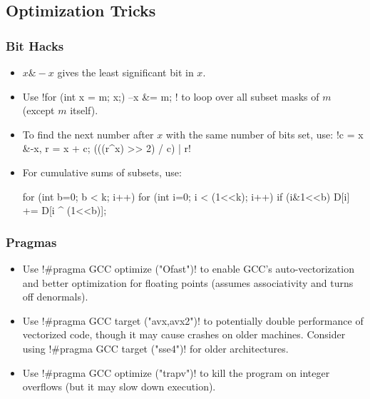 \subsection{Optimization Tricks}

\subsubsection{Bit Hacks}
\begin{itemize}
    \item \( x \& -x \) gives the least significant bit in \( x \).
    \item Use \inlinecode!for (int x = m; x;) { --x &= m; }! to loop over all subset
          masks of \( m \) (except \( m \) itself).
    \item To find the next number after \( x \) with the same number of bits set, use:
          \inlinecode!c = x &-x, r = x + c; (((r^x) >> 2) / c) | r!
    \item For cumulative sums of subsets, use:
          \begin{codesnippet}
    for (int b=0; b < k; i++)
        for (int i=0; i < (1<<k); i++) 
            if (i&1<<b) D[i] += D[i ^ (1<<b)]; 
          \end{codesnippet}
\end{itemize}

\subsubsection{Pragmas}
\begin{itemize}
    \item Use \inlinecode!#pragma GCC optimize ("Ofast")! to enable GCC's
          auto-vectorization and better optimization for floating points (assumes
          associativity and turns off denormals).
    \item Use \inlinecode!#pragma GCC target ("avx,avx2")! to potentially double
          performance of vectorized code, though it may cause crashes on older machines.
          Consider using \inlinecode!#pragma GCC target ("sse4")! for older
          architectures.
    \item Use \inlinecode!#pragma GCC optimize ("trapv")! to kill the program on integer
          overflows (but it may slow down execution).
\end{itemize}